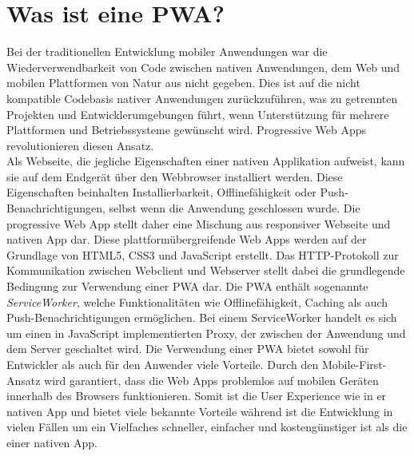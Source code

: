 \section{Was ist eine PWA?}
Bei der traditionellen Entwicklung mobiler Anwendungen war die Wiederverwendbarkeit von Code zwischen nativen Anwendungen, dem Web und mobilen Plattformen von Natur aus nicht gegeben. Dies ist auf die nicht kompatible Codebasis nativer Anwendungen zurückzuführen, was zu getrennten Projekten und Entwicklerumgebungen führt, wenn Unterstützung für mehrere Plattformen und Betriebssysteme gewünscht wird.\autocite[vgl.][]{Maj}
Progressive Web Apps revolutionieren diesen Ansatz.\\
Als Webseite, die jegliche Eigenschaften einer nativen Applikation aufweist, kann sie auf dem Endgerät über den Webbrowser installiert werden. Diese Eigenschaften beinhalten Installierbarkeit, Offlinefähigkeit oder Push-Benachrichtigungen, selbst wenn die Anwendung geschlossen wurde. Die progressive Web App stellt daher eine Mischung aus responsiver Webseite und nativen App dar.
Diese plattformübergreifende Web Apps werden auf der Grundlage von HTML5, CSS3 und JavaScript erstellt. Das HTTP-Protokoll zur Kommunikation zwischen Webclient und Webserver stellt dabei die grundlegende Bedingung zur Verwendung einer PWA dar.
Die PWA enthält sogenannte \textit{ServiceWorker}, welche Funktionalitäten wie Offlinefähigkeit, Caching als auch Push-Benachrichtigungen ermöglichen. Bei einem ServiceWorker handelt es sich um einen in JavaScript implementierten Proxy, der zwischen der Anwendung und dem Server geschaltet wird.\autocite[vgl.][]{Hume.2018}
Die Verwendung einer PWA bietet sowohl für Entwickler als auch für den Anwender viele Vorteile. Durch den Mobile-First-Ansatz wird garantiert, dass die Web Apps problemlos auf mobilen Geräten innerhalb des Browsers funktionieren. Somit ist die User Experience wie in er nativen App und bietet viele bekannte Vorteile während ist die Entwicklung in vielen Fällen um ein Vielfaches schneller, einfacher und kostengünstiger ist als die einer nativen App.

